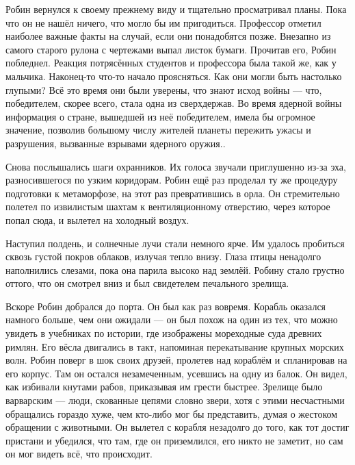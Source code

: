 \documentclass[a4paper,12pt]{book}
\begin{document}
	Робин вернулся к своему прежнему виду и тщательно просматривал планы. Пока что он не нашёл ничего, что могло бы им пригодиться. Профессор отметил наиболее важные факты на случай, если они понадобятся позже. Внезапно из самого старого рулона с чертежами выпал листок бумаги. Прочитав его, Робин побледнел. Реакция потрясённых студентов и профессора была такой же, как у мальчика.
	Наконец-то что-то начало проясняться. Как они могли быть настолько глупыми? Всё это время они были уверены, что знают исход войны — что, победителем, скорее всего, стала одна из сверхдержав. Во время ядерной войны информация о стране, вышедшей из неё победителем,  имела бы огромное значение, позволив большому числу жителей планеты пережить ужасы и разрушения, вызванные взрывами ядерного оружия..

	Снова послышались шаги охранников. Их голоса звучали приглушенно из-за эха, разносившегося по узким коридорам. Робин ещё раз проделал ту же процедуру подготовки к метаморфозе, на этот раз превратившись в орла. Он стремительно полетел по извилистым шахтам к вентиляционному отверстию, через которое попал сюда, и вылетел на холодный воздух.
	
	Наступил полдень, и солнечные лучи стали немного ярче. Им удалось пробиться сквозь густой покров облаков, излучая тепло внизу. Глаза птицы ненадолго наполнились слезами, пока она парила высоко над землёй. Робину стало грустно оттого, что он смотрел вниз и был свидетелем печального зрелища.

	Вскоре Робин добрался до порта. Он был как раз вовремя. Корабль оказался намного больше, чем они ожидали — он был похож на один из тех, что можно увидеть в учебниках по истории, где изображены мореходные суда древних римлян. Его вёсла двигались в такт, напоминая перекатывание крупных морских волн.
	Робин поверг в шок своих друзей, пролетев над кораблём и спланировав на его корпус. Там он остался незамеченным, усевшись на одну из балок. Он видел, как избивали кнутами рабов, приказывая им грести быстрее. Зрелище было варварским — люди, скованные цепями словно звери, хотя с этими несчастными обращались гораздо хуже, чем кто-либо мог бы представить, думая о жестоком обращении с животными.
	Он вылетел с корабля незадолго до того, как тот достиг пристани и убедился, что там, где он приземлился, его никто не заметит, но сам он мог видеть всё, что происходит.
\end{document}
